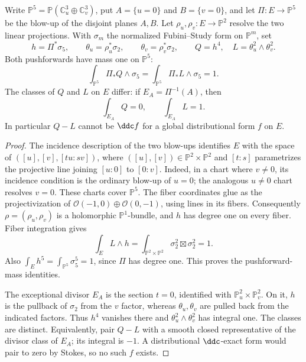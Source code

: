 \begin{lemma}\label{lem:exceptional-cohomology-countercheck}
Write $\mathbb P^5=\mathbb P(\mathbb C^3_u\oplus\mathbb C^3_v)$, put $A=\{u=0\}$ and $B=\{v=0\}$, and let $\Pi:E\to\mathbb P^5$ be the blow-up of the disjoint planes $A,B$. Let $\rho_u,\rho_v:E\to\mathbb P^2$ resolve the two linear projections. With $\sigma_m$ the normalized Fubini--Study form on $\mathbb P^m$, set
\[
 h=\Pi^*\sigma_5,\qquad
 \theta_u=\rho_u^*\sigma_2,\qquad
 \theta_v=\rho_v^*\sigma_2,\qquad
 Q=h^4,\quad L=\theta_u^2\wedge\theta_v^2.
\]
Both pushforwards have mass one on $\mathbb P^5$:
\[
 \int_{\mathbb P^5}\Pi_*Q\wedge\sigma_5
 =\int_{\mathbb P^5}\Pi_*L\wedge\sigma_5=1.
\]
The classes of $Q$ and $L$ on $E$ differ: if $E_A=\Pi^{-1}(A)$, then
\[
 \int_{E_A}Q=0,\qquad \int_{E_A}L=1.
\]
In particular $Q-L$ cannot be $\ddc f$ for a global distributional form $f$ on $E$.
\end{lemma}
\begin{proof}
The incidence description of the two blow-ups identifies $E$ with the space of $([u],[v],[tu:sv])$, where $([u],[v])\in\mathbb P^2\times\mathbb P^2$ and $[t:s]$ parametrizes the projective line joining $[u:0]$ to $[0:v]$. Indeed, in a chart where $v\neq0$, its incidence condition is the ordinary blow-up of $u=0$; the analogous $u\neq0$ chart resolves $v=0$. These charts cover $\mathbb P^5$. The fiber coordinates glue as the projectivization of $\mathcal O(-1,0)\oplus\mathcal O(0,-1)$, using lines in its fibers. Consequently $\rho=(\rho_u,\rho_v)$ is a holomorphic $\mathbb P^1$-bundle, and $h$ has degree one on every fiber. Fiber integration gives
\[
 \int_E L\wedge h
 =\int_{\mathbb P^2\times\mathbb P^2}
       \sigma_2^2\boxtimes\sigma_2^2=1.
\]
Also $\int_E h^5=\int_{\mathbb P^5}\sigma_5^5=1$, since $\Pi$ has degree one. This proves the pushforward-mass identities.

The exceptional divisor $E_A$ is the section $t=0$, identified with $\mathbb P^2_u\times\mathbb P^2_v$. On it, $h$ is the pullback of $\sigma_2$ from the $v$ factor, whereas $\theta_u,\theta_v$ are pulled back from the indicated factors. Thus $h^4$ vanishes there and $\theta_u^2\wedge\theta_v^2$ has integral one. The classes are distinct. Equivalently, pair $Q-L$ with a smooth closed representative of the divisor class of $E_A$; its integral is $-1$. A distributional $\ddc$-exact form would pair to zero by Stokes, so no such $f$ exists.
\end{proof}

